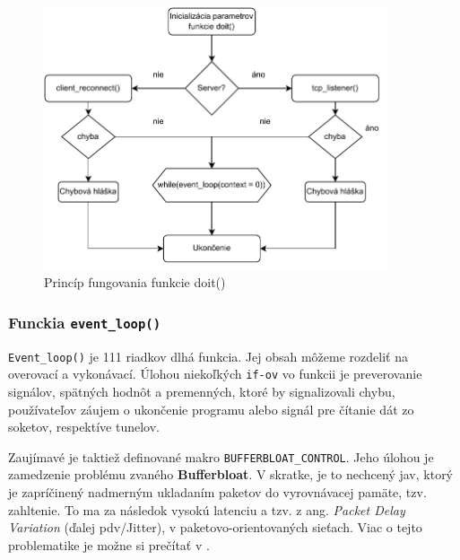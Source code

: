 \begin{figure}[!h]
	\centering
	\includegraphics[width=0.9\textwidth]{figures/fc2}
	\caption{Princíp fungovania funkcie doit()}
	\label{fc2}
\end{figure}

\subsubsection{Funckia \lstinline|event_loop()|}
\lstinline|Event_loop()| je 111 riadkov dlhá funkcia. Jej obsah môžeme rozdeliť na overovací a vykonávací. Úlohou niekoľkých \lstinline|if-ov| vo funkcii je preverovanie signálov, spätných hodnôt a premenných, ktoré by signalizovali chybu, používateľov záujem o ukončenie programu alebo signál pre čítanie dát zo soketov, respektíve tunelov. 
 
Zaujímavé je taktiež definované makro \lstinline|BUFFERBLOAT_CONTROL|. Jeho úlohou je zamedzenie problému zvaného \textbf{Bufferbloat}. V skratke, je to nechcený jav, ktorý je zapríčinený nadmerným ukladaním paketov do vyrovnávacej pamäte, tzv. zahltenie. To ma za následok vysokú latenciu a tzv. z ang. \textit{Packet Delay Variation} (ďalej \acrshort{pdv}/Jitter), v paketovo-orientovaných sieťach. Viac o tejto problematike je možne si prečítať v \cite{bufferbloat}.
 
